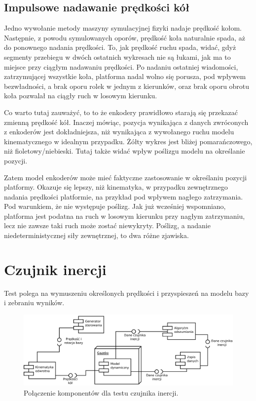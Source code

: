 	\subsection{Impulsowe nadawanie prędkości kół}
		Jedno wywołanie metody maszyny symulacyjnej fizyki nadaje prędkość kołom. Następnie, z powodu symulowanych oporów, prędkość koła naturalnie spada, aż do
		ponownego nadania prędkości. To, jak prędkość ruchu spada, widać, gdyż segmenty przebiegu w dwóch ostatnich wykresach nie są łukami, jak ma to miejsce przy 
		ciągłym nadawaniu prędkości. Po nadaniu ostatniej wiadomości, zatrzymującej wszystkie koła, platforma nadal wolno się porusza, pod wpływem bezwładności, a brak oporu rolek w jednym z kierunków, oraz brak oporu obrotu koła pozwalał na ciągły ruch w losowym kierunku.
		
		Co warto tutaj zauważyć, to to że enkodery prawidłowo starają się przekazać zmienną prędkość kół. 
		Inaczej mówiąc, pozycja wynikająca z danych zwróconych z enkoderów jest dokładniejsza, niż wynikająca z wywołanego ruchu modelu kinematycznego w idealnym przypadku.
		Żółty wykres jest bliżej pomarańczowego, niż fioletowy/niebieski.
		Tutaj także widać wpływ poślizgu modelu na określanie pozycji.
		
		Zatem model enkoderów może mieć faktyczne zastosowanie w określaniu pozycji platformy. 
		Okazuje się lepszy, niż kinematyka, w przypadku zewnętrznego nadania prędkości platformie, na przykład pod wpływem nagłego zatrzymania.
		Pod warunkiem, że nie występuje poślizg. Jak już wcześniej wspomniano, platforma jest podatna na ruch w losowym kierunku przy nagłym zatrzymaniu,
		lecz nie zawsze taki ruch może zostać niewykryty. Poślizg, a nadanie niedeterministycznej siły zewnętrznej, to dwa różne zjawiska.
		
\section{Czujnik inercji}
\label{sec:test_imu}
	Test polega na wymuszeniu określonych prędkości i przyspieszeń na modelu bazy i zebraniu wyników.
	
	\begin{figure}[H]
		\centering
		\includegraphics[width=\textwidth]{uml/wewucho.pdf}
		\caption{Połączenie komponentów dla testu czujnika inercji.}
		\label{uml:wewucho}
	\end{figure}
	
